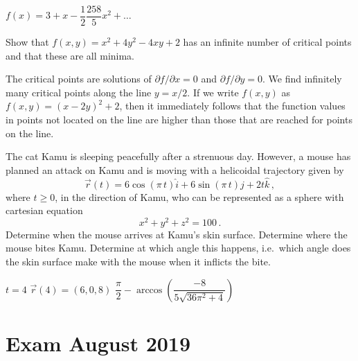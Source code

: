 \begin{Answer}\phantom{}
$f(x) = 3 + x - \dfrac{1}{2} \dfrac{258}{5}x^2 + \ldots $
\end{Answer}


\begin{Exercise} %
Show that $f(x,y)= x^2+4y^2-4xy+2$ has an infinite number of critical points and that these are all minima.
\end{Exercise}

\begin{Answer}\phantom{}
The critical points are solutions of $\partial f/ \partial x = 0$ and $\partial f/ \partial y = 0$. We find infinitely many critical points along the line $y= x/2$. If we write $f(x,y)$ as $f(x,y) = (x-2y)^2 + 2$, then it immediately follows that the function values in points not located on the line are higher than those that are reached for points on the line. 
\end{Answer}


\begin{Exercise} %
The cat Kamu is sleeping peacefully after a strenuous day. However, a mouse has planned an attack on Kamu and is moving with a helicoidal trajectory
given by
$$
\vec{r}(t)=6\cos(\pi\,t)\hat{i}+6\sin(\pi\,t)\hat{j}+2t\hat{k}\,,
$$
where $t\geq0$, in the direction of Kamu, who can be represented as a sphere with cartesian equation
$$
x^2+y^2+z^2=100\,.
$$
\Question Determine when the mouse arrives at Kamu's skin surface.
\Question Determine where the mouse bites Kamu.
\Question Determine at which angle this happens, i.e.\ which angle does the skin surface make with the mouse when it inflicts the bite.
\EndCurrentQuestion
\end{Exercise}

\begin{Answer}\phantom{}
\begin{multicols}{2}
\Question $t=4$
\Question $\vec{r}(4) = (6,0,8)$
\Question $\dfrac{\pi}{2} - \arccos\left(\dfrac{-8}{5 \sqrt{36 \pi^2 + 4}} \right)$
 \EndCurrentQuestion
\end{multicols}

\end{Answer}


\section{Exam August 2019}

